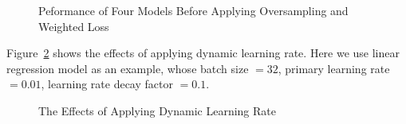 \documentclass{article}
\begin{document}
\begin{figure}[H]
{    }
    \hspace{2mm}
    \hspace{2mm}
    \caption{Peformance of Four Models Before Applying Oversampling and Weighted Loss}
    \label{Figure 4}
\end{figure}

Figure~\ref{Figure 5} shows the effects of applying dynamic learning rate. Here we
use linear regression model as an example, whose batch size $=32$, primary learning rate $=0.01$,
learning rate decay factor $=0.1$.

\begin{figure}[H]
    \centering
    \hspace{8mm}
    \hspace{22mm}
    \caption{The Effects of Applying Dynamic Learning Rate}
    \label{Figure 5}
\end{figure}
\end{document}
